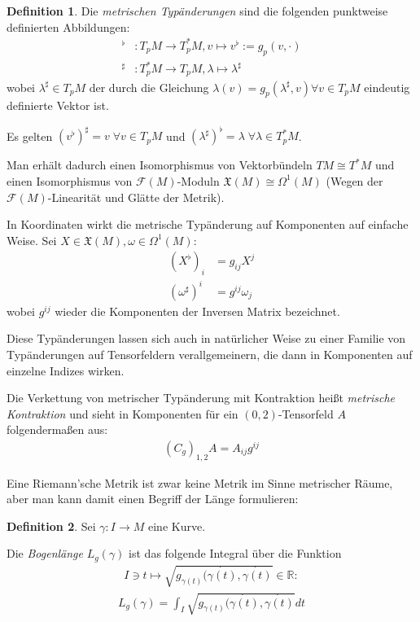\documentclass[a4paper]{scrreprt}
\numberwithin{equation}{chapter}
\newcommand{\R}{\mathbb{R}}
\newcommand{\sm}{\mathcal{F}}
\newcommand{\vf}{\mathfrak{X}}
\theoremstyle{definition}
\newtheorem{defn}{Definition}[section]
\begin{document}
		\begin{defn}
			Die \emph{metrischen Typänderungen} sind die folgenden punktweise definierten Abbildungen:
			\begin{align*}
				^{\flat}&\colon T_pM\rightarrow T_p^*M, v\mapsto v^{\flat}:=g_p(v,\cdot)\\
				^{\sharp}&\colon T_p^*M\rightarrow T_pM, \lambda\mapsto \lambda^{\sharp}
			\end{align*}
			wobei $\lambda^{\sharp}\in T_pM$ der durch die Gleichung $\lambda(v)=g_p(\lambda^{\sharp},v)\forall v\in T_pM$ eindeutig definierte Vektor ist.
			
			Es gelten $(v^{\flat})^{\sharp}=v\;\forall v\in T_pM$ und $(\lambda^{\sharp})^{\flat}=\lambda\;\forall\lambda\in T_p^*M$.
			
			Man erhält dadurch einen Isomorphismus von Vektorbündeln $TM\cong T^*M$ und einen Isomorphismus von $\sm(M)$-Moduln $\vf(M)\cong \Omega^1(M)$ (Wegen der $\sm(M)$-Linearität und Glätte der Metrik).
			
			In Koordinaten wirkt die metrische Typänderung auf Komponenten auf einfache Weise. Sei $X\in\vf(M), \omega\in\Omega^1(M)$:
			\begin{align*}
				(X^{\flat})_i&=g_{ij}X^j\\
				(\omega^{\sharp})^i&=g^{ij}\omega_j
			\end{align*}
			wobei $g^{ij}$ wieder die Komponenten der Inversen Matrix bezeichnet.
			
			Diese Typänderungen lassen sich auch in natürlicher Weise zu einer Familie von Typänderungen auf Tensorfeldern verallgemeinern, die dann in Komponenten \glqq auf einzelne Indizes wirken\grqq . 
			
			Die Verkettung von metrischer Typänderung mit Kontraktion heißt \emph{metrische Kontraktion} und sieht in Komponenten für ein $(0,2)$-Tensorfeld $A$ folgendermaßen aus:
			\begin{align*}
				(C_g)_{1,2}A=A_{ij}g^{ij}
			\end{align*}
		\end{defn}
		Eine Riemann'sche Metrik ist zwar keine Metrik im Sinne metrischer Räume, aber man kann damit einen Begriff der Länge formulieren:
		\begin{defn}
			Sei $\gamma\colon I\rightarrow M$ eine Kurve.
			
			Die \emph{Bogenlänge} $L_g(\gamma)$ ist das folgende Integral über die Funktion 
			\begin{align*}
				I\ni t\mapsto \sqrt{g_{\gamma(t)}(\dot{\gamma(t)},\dot{\gamma(t)}}\in\R:
				\end{align*}
			\begin{align*}
				L_g(\gamma)=\int_I\sqrt{g_{\gamma(t)}(\dot{\gamma(t)},\dot{\gamma(t)}} dt
			\end{align*}
		\end{defn}
		
\end{document}
